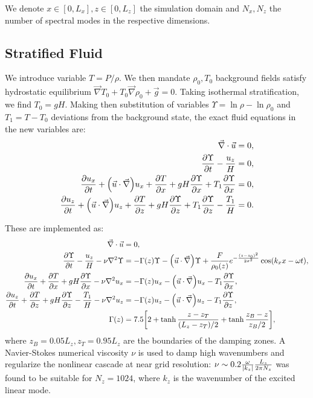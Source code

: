 \documentclass[twocolumn,
        nofootinbib,
        usenames, %
        dvipsnames %
    ]{revtex4-1}%
\newcommand*{\pd}[2]{\frac{\partial#1}{\partial#2}}
\DeclarePairedDelimiter\abs{\lvert}{\rvert}
\DeclarePairedDelimiter\p{\lparen}{\rparen}
\DeclarePairedDelimiter\s{\lbrack}{\rbrack}
\begin{document}
We denote $x \in [0, L_x], z \in [0, L_z]$ the simulation domain and $N_x, N_z$
the number of spectral modes in the respective dimensions.

\subsection{Stratified Fluid}\label{ss:strat_impl}

We introduce variable $T = P/\rho$. We then mandate $\rho_0, T_0$ background
fields satisfy hydrostatic equilibrium $\vec{\nabla}T_0 + T_0 \vec{\nabla}\rho_0
+ \vec{g} = 0$. Taking isothermal stratification, we find $T_0 = gH$. Making
then substitution of variables $\Upsilon = \ln \rho - \ln \rho_0$ and $T_1 = T -
T_0$ deviations from the background state, the exact fluid equations in the new
variables are:
\begin{subequations}\label{se:fc_var}
    \begin{align}
        \vec{\nabla} \cdot \vec{u} &= 0,\\
        \pd{\Upsilon}{t} - \frac{u_z}{H} &= 0,\\
        \pd{u_x}{t} + \p*{\vec{u} \cdot \vec{\nabla}}u_x
            + \pd{T}{x} + gH\pd{\Upsilon}{x}
            + T_1 \pd{\Upsilon}{x} &= 0,\\
        \pd{u_z}{t} + \p*{\vec{u} \cdot \vec{\nabla}}u_z
            + \pd{T}{z} + gH\pd{\Upsilon}{z}
            + T_1 \pd{\Upsilon}{z} - \frac{T_1}{H} &= 0.
    \end{align}
\end{subequations}

These are implemented as:
\begin{subequations}\label{se:curr_num}
    \begin{align}
        \vec{\nabla} \cdot \vec{u} &= 0,\\
        \pd{\Upsilon}{t} - \frac{u_z}{H}
            - \nu \nabla^2 \Upsilon &= -\Gamma(z) \Upsilon
                - \p*{\vec{u} \cdot \vec{\nabla}}\Upsilon
                + \frac{F}{\rho_0(z)}e^{-\frac{(z - z_0)^2}{2\sigma^2}}
                    \cos \p*{k_xx - \omega t},\\
        \pd{u_x}{t} + \pd{T}{x} + gH\pd{\Upsilon}{x}
            - \nu \nabla^2 u_x
            &= -\Gamma(z) u_x
                - \p*{\vec{u} \cdot \vec{\nabla}}u_x
                - T_1 \pd{\Upsilon}{x},\\
        \pd{u_z}{t} + \pd{T}{z} + gH\pd{\Upsilon}{z} - \frac{T_1}{H}
            - \nu \nabla^2 u_z &= -\Gamma(z) u_z
                - \p*{\vec{u} \cdot \vec{\nabla}}u_z
                - T_1 \pd{\Upsilon}{z},\\
    \Gamma(z) &= 7.5\s*{2 + \tanh \frac{z - z_T}{(L_z - z_T) / 2}
        + \tanh \frac{z_B - z}{z_B / 2}},\label{eq:Gamma}
    \end{align}
\end{subequations}
where $z_B = 0.05L_z, z_T = 0.95L_z$ are the boundaries of the damping zones. A
Navier-Stokes numerical viscosity $\nu$ is used to damp high wavenumbers and
regularize the nonlinear cascade at near grid resolution: $\nu \sim 0.2
\frac{\omega}{\abs*{k_z}}\frac{L_z}{2\pi N_z}$ was found to be suitable for $N_z
= 1024$, where $k_z$ is the wavenumber of the excited linear mode.
\end{document}

